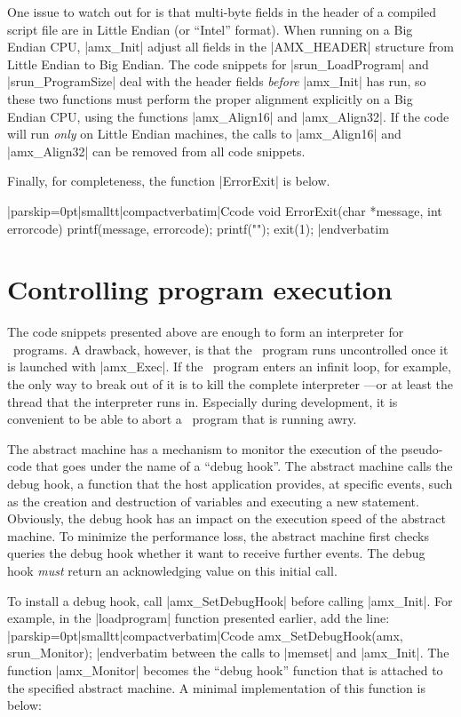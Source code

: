  
One issue to watch out for is that multi-byte fields in the header of a
compiled script file are in Little Endian (or ``Intel'' format). When running
on a Big Endian CPU, |amx_Init| adjust all fields in the |AMX_HEADER| structure
from Little Endian to Big Endian. The code snippets for |srun_LoadProgram| and
|srun_ProgramSize| deal with the header fields {\it before\/} |amx_Init| has
run, so these two functions must perform the proper alignment explicitly on a
Big Endian CPU, using the functions |amx_Align16| and |amx_Align32|. If the
code will run {\it only\/} on Little Endian machines, the calls to |amx_Align16|
and |amx_Align32| can be removed from all code snippets.

Finally, for completeness, the function |ErrorExit| is below.

\listingx\verbatim|parskip=0pt|smalltt|compactverbatim|Ccode
void ErrorExit(char *message, int errorcode)
{
  printf(message, errorcode);
  printf("\n");
  exit(1);
}
|endverbatim\endlistingx


\section{Controlling program execution}
The code snippets presented above are enough to form an interpreter for
\Small\ programs. A drawback, however, is that the \Small\ program runs uncontrolled once
it is launched with |amx_Exec|. If the \Small\ program enters an infinit loop,
for example, the only way to break out of it is to kill the complete
interpreter ---or at least the thread that the interpreter runs in. Especially
during development, it is convenient to be able to abort a \Small\ program that
is running awry.

The abstract machine has a mechanism to monitor the execution of the pseudo-code
that goes under the name of a ``debug hook''. The abstract machine calls the
debug hook, a function that the host application provides, at specific events,
such as the creation and destruction of variables and executing a new statement.
Obviously, the debug hook has an impact on the execution speed of the abstract
machine. To minimize the performance loss, the abstract machine first checks
queries the debug hook whether it want to receive further events. The debug
hook {\it must\/} return an acknowledging value on this initial call.

To install a debug hook, call |amx_SetDebugHook| before calling |amx_Init|. For
example, in the |loadprogram| function presented earlier, add the line:
\listingx\verbatim|parskip=0pt|smalltt|compactverbatim|Ccode
amx_SetDebugHook(amx, srun_Monitor);
|endverbatim\endlistingx
between the calls to |memset| and |amx_Init|. The function |amx_Monitor|
becomes the ``debug hook'' function that is attached to the specified abstract
machine. A minimal implementation of this function is below:

